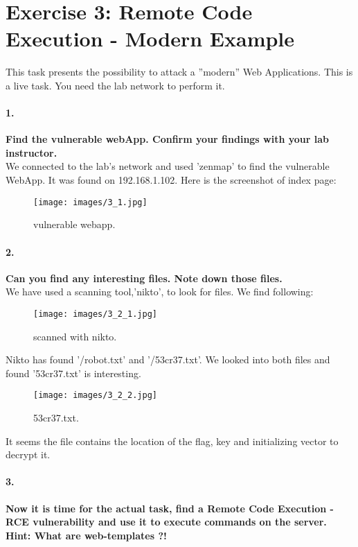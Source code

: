 \documentclass[12pt]{report}
\begin{document}
	
	\section*{Exercise 3: Remote Code Execution - Modern Example}
	
	This task presents the possibility to attack a ''modern'' Web Applications. This is a live task. You need the lab	network to perform it.
	
	\paragraph*{1.}{\bf Find the vulnerable webApp. Confirm your findings with your lab instructor.}\\
	
	We connected to the lab's network and used 'zenmap' to find the vulnerable WebApp. It was found on 192.168.1.102. Here is the screenshot of index page:
	
	\begin{figure}[H]
		\texttt{[image: images/3\_1.jpg]}
		\caption{vulnerable webapp.}
	\end{figure}

	\paragraph*{2.}{\bf Can you find any interesting files. Note down those files.}\\
	
	We have used a scanning tool,'nikto', to look for files. We find following:
	
	\begin{figure}[H]
		\texttt{[image: images/3\_2\_1.jpg]}
		\caption{scanned with nikto.}
	\end{figure}
	
	Nikto has found '/robot.txt' and '/53cr37.txt'. We looked into both files and found '53cr37.txt' is interesting.
	\begin{figure}[H]
		\texttt{[image: images/3\_2\_2.jpg]}
		\caption{53cr37.txt.}
	\end{figure}
	It seems the file contains the location of the flag, key and initializing vector to decrypt it.
	
	\paragraph*{3.}{\bf Now it is time for the actual task, find a Remote Code Execution - RCE vulnerability and use it to execute commands on the server.\\
	Hint: What are web-templates ?!}\\
\end{document}
